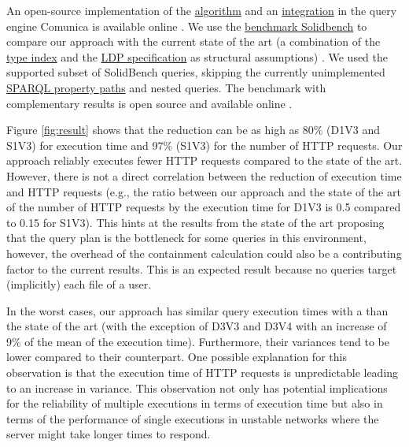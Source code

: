 An open-source implementation of the \href{https://github.com/constraintAutomaton/query-shape-detection}{algorithm} and an 
\href{https://github.com/constraintAutomaton/comunica-feature-link-traversal/tree/feature/shapeIndex}{integration} in the query engine 
Comunica \cite{taelman_iswc_resources_comunica_2018} is available online .
We use the \href{https://github.com/SolidBench/SolidBench.js}{benchmark Solidbench} \cite{Taelman2023} to compare our approach with the current state of the art 
(a combination of the \href{https://solid.github.io/type-indexes/}{type index} and the \href{https://www.w3.org/TR/ldp/}{LDP specification} as structural assumptions) \cite{Taelman2023}.
We used the supported subset of SolidBench queries,
skipping the currently unimplemented
\href{https://www.w3.org/TR/sparql11-query/#propertypaths}{SPARQL property paths} and nested queries.
The benchmark with complementary results is open source and available online .

Figure \ref{fig:result} shows that the  reduction can be as high as 80\% (D1V3 and S1V3) for execution time 
and 97\% (S1V3) for the number of HTTP requests.
Our approach reliably executes fewer HTTP requests compared to the state of the art.
However, there is not a direct correlation between the reduction of execution time and HTTP requests (e.g., the ratio 
between our approach and the state of the art of the number of HTTP requests by the execution time for D1V3 is 0.5 compared to 0.15 for S1V3).
This hints at the results from the state of the art \cite{Taelman2023} proposing that the query plan is the bottleneck for some queries in this environment,
however, the overhead of the containment calculation could also be a contributing factor to the current results.
This is an expected result because no queries target (implicitly) each file of a user.

In the worst cases, our approach  has similar query execution times with a 
  than the state of the art (with the exception of D3V3 and D3V4 with an increase of 9\% of the mean of the execution time).
Furthermore, their variances tend to be lower compared to their counterpart. 
One possible explanation for this observation is that the execution time of HTTP requests is unpredictable \cite{hartig2016walking}
leading to an increase in variance.
This observation not only has potential implications for the reliability of multiple executions in terms of execution time
but also in terms of the performance of single executions in unstable networks where the server might take longer times to respond. 

